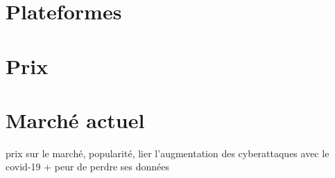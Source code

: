 \section{Plateformes}
\section{Prix}
\section{Marché actuel}
prix sur le marché, popularité, lier l'augmentation des cyberattaques avec le covid-19 + peur de perdre ses données